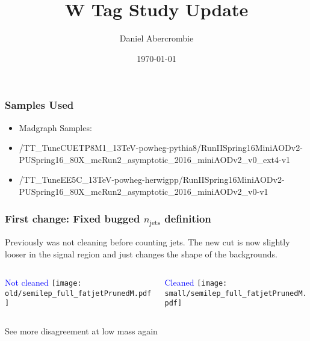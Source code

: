 \documentclass{beamer}
\author[D. Abercrombie]{
  Daniel Abercrombie
}
\title{\bf \sffamily W Tag Study Update}
\date{\today}
\begin{document}
\begin{frame}[nonumbering]
  \titlepage
\end{frame}

\begin{frame}
  \frametitle{Samples Used}
  {\scriptsize
  \begin{itemize}
  \item Madgraph Samples:
  \item /TT\_TuneCUETP8M1\_13TeV-powheg-pythia8/RunIISpring16MiniAODv2-PUSpring16\_80X\_mcRun2\_asymptotic\_2016\_miniAODv2\_v0\_ext4-v1
  \item /TT\_TuneEE5C\_13TeV-powheg-herwigpp/RunIISpring16MiniAODv2-PUSpring16\_80X\_mcRun2\_asymptotic\_2016\_miniAODv2\_v0-v1
  \end{itemize}
  }
\end{frame}

\begin{frame}
  \frametitle{First change: Fixed bugged $n_\text{jets}$ definition}
  Previously was not cleaning before counting jets.
  The new cut is now slightly looser in the signal region and just changes the shape of the backgrounds.
  \vspace{6pt}
  \begin{columns}
    \begin{column}{0.5\linewidth}
      \centering
      \textcolor{blue}{Not cleaned}
      \texttt{[image: old/semilep\_full\_fatjetPrunedM.pdf]}
    \end{column}
    \begin{column}{0.5\linewidth}
      \centering
      \textcolor{blue}{Cleaned}
      \texttt{[image: small/semilep\_full\_fatjetPrunedM.pdf]}
    \end{column}
  \end{columns}
  See more disagreement at low mass again
\end{frame}
\end{document}
